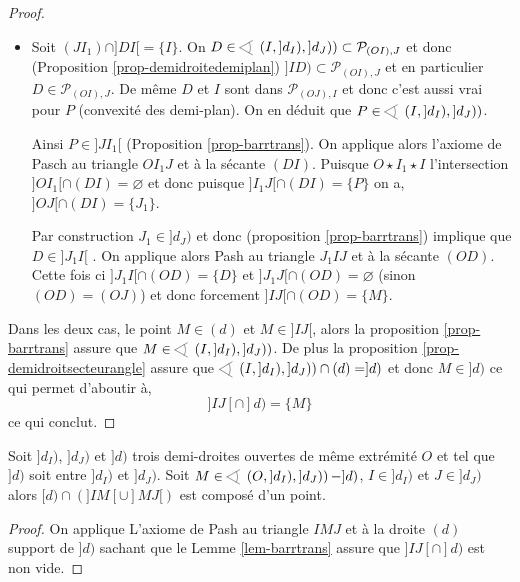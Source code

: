 \begin{lem}
\begin{proof}
\begin{itemize}[$\bullet$]
            \item Soit $(JI_1)\cap ]DI[=\{I\}$. On $D\in \anglesaillant\left(I,]d_I),]d_J)\right)\subset \mathcal{P}_{(OI),J}$ et donc (Proposition \ref{prop-demidroitedemiplan}) $]ID)\subset \mathcal{P}_{(OI),J}$ et en particulier $D \in \mathcal{P}_{(OI),J}$. De même $D$ et $I$ sont dans $\mathcal{P}_{(OJ),I}$ et donc c'est aussi vrai pour $P$ (convexité des demi-plan). On en déduit que $P\in \anglesaillant\left(I,]d_I),]d_J)\right)$. 
            
            Ainsi $P\in]J I_1[$ (Proposition \ref{prop-barrtrans}). On applique alors l'axiome de Pasch au triangle $OI_1 J$ et à la sécante $(DI)$. Puisque $O\star I_1\star I$ l'intersection $]OI_1[\cap (DI)=\varnothing$ et donc puisque $]I_1 J[\cap (DI)=\{P\}$ on a, $]OJ[\cap (DI)=\{J_1\}$.

            Par construction $J_1\in ]d_J)$ et donc (proposition \ref{prop-barrtrans}) implique que $D\in ]J_1 I[$ . On applique alors Pash au triangle $J_1 I J$ et à la sécante $(OD)$. Cette fois ci $]J_1 I[\cap (OD)=\{D\}$ et $]J_1 J[\cap (OD)=\varnothing$ (sinon $(OD)=(OJ)$) et donc forcement $]IJ[\cap (OD)=\{M\}$. 
        \end{itemize}
        Dans les deux cas, le point $M\in (d)$ et  $M\in ]IJ[$, alors la proposition \ref{prop-barrtrans} assure que $M\in \anglesaillant\left(I,]d_I),]d_J)\right)$. De plus la proposition \ref{prop-demidroitsecteurangle} assure que $\anglesaillant\left(I,]d_I),]d_J)\right) \cap (d) = ]d)$ et donc $M\in ]d)$ ce qui permet d'aboutir à,
        \begin{equation*}
            ]IJ[\cap ]d) =\{M\}
        \end{equation*}
        ce qui conclut.
    \end{proof}    
\end{lem}
\begin{lem}\label{lem-pashsect}
    Soit $]d_I)$, $]d_J)$ et $]d)$ trois demi-droites ouvertes de même extrémité $O$ et tel que $]d)$ soit entre $]d_I)$ et $]d_J)$. Soit $M \in \anglesaillant\left({O},{]d_I)},{]d_J)}\right) - ]d)$, $I\in ]d_I)$ et $J\in]d_J)$ alors $[d)\cap\left(]IM[\cup]MJ[\right)$ est composé d'un point. 
    \begin{proof}
        On applique L'axiome de Pash au triangle $IMJ$ et à la droite $(d)$ support de $]d)$ sachant que le Lemme \ref{lem-barrtrans} assure que $]IJ[\cap ]d)$ est non vide. 
    \end{proof}
\end{lem}
